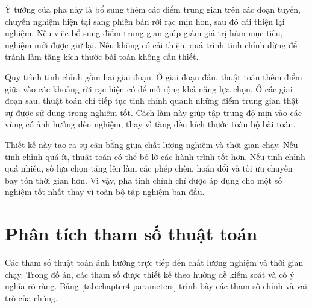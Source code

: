 Ý tưởng của pha này là bổ sung thêm các điểm trung gian trên các đoạn tuyến, chuyển nghiệm hiện tại sang phiên bản rời rạc mịn hơn, sau đó cải thiện lại nghiệm. Nếu việc bổ sung điểm trung gian giúp giảm giá trị hàm mục tiêu, nghiệm mới được giữ lại. Nếu không có cải thiện, quá trình tinh chỉnh dừng để tránh làm tăng kích thước bài toán không cần thiết.

Quy trình tinh chỉnh gồm hai giai đoạn. Ở giai đoạn đầu, thuật toán thêm điểm giữa vào các khoảng rời rạc hiện có để mở rộng khả năng lựa chọn. Ở các giai đoạn sau, thuật toán chỉ tiếp tục tinh chỉnh quanh những điểm trung gian thật sự được sử dụng trong nghiệm tốt. Cách làm này giúp tập trung độ mịn vào các vùng có ảnh hưởng đến nghiệm, thay vì tăng đều kích thước toàn bộ bài toán.

Thiết kế này tạo ra sự cân bằng giữa chất lượng nghiệm và thời gian chạy. Nếu tinh chỉnh quá ít, thuật toán có thể bỏ lỡ các hành trình tốt hơn. Nếu tinh chỉnh quá nhiều, số lựa chọn tăng lên làm các phép chèn, hoán đổi và tối ưu chuyến bay tốn thời gian hơn. Vì vậy, pha tinh chỉnh chỉ được áp dụng cho một số nghiệm tốt nhất thay vì toàn bộ tập nghiệm ban đầu.

\section{Phân tích tham số thuật toán}

Các tham số thuật toán ảnh hưởng trực tiếp đến chất lượng nghiệm và thời gian chạy. Trong đồ án, các tham số được thiết kế theo hướng dễ kiểm soát và có ý nghĩa rõ ràng. Bảng \ref{tab:chapter4-parameters} trình bày các tham số chính và vai trò của chúng.

